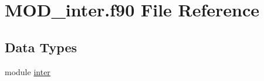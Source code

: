 \hypertarget{MOD__inter_8f90}{\section{M\-O\-D\-\_\-inter.\-f90 File Reference}
\label{MOD__inter_8f90}
}
\subsection*{Data Types}
\begin{DoxyCompactItemize}
\item 
module \hyperlink{classinter}{inter}
\end{DoxyCompactItemize}
